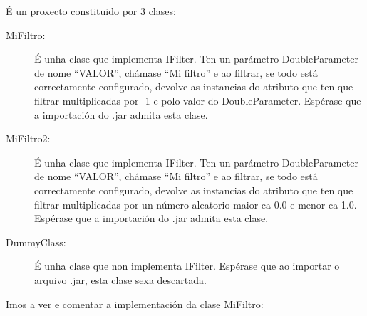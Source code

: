 É un proxecto constituido por 3 clases:

\begin{description}
\item[MiFiltro:] \hfill
É unha clase que implementa IFilter. Ten un parámetro DoubleParameter de nome ``VALOR'', chámase ``Mi filtro'' e ao filtrar, se todo está correctamente configurado, devolve as instancias do atributo que ten que filtrar multiplicadas por -1 e polo valor do DoubleParameter. Espérase que a importación do .jar admita esta clase.
\item[MiFiltro2:] \hfill
É unha clase que implementa IFilter. Ten un parámetro DoubleParameter de nome ``VALOR'', chámase ``Mi filtro'' e ao filtrar, se todo está correctamente configurado, devolve as instancias do atributo que ten que filtrar multiplicadas por un número aleatorio maior ca 0.0 e menor ca 1.0. Espérase que a importación do .jar admita esta clase.
\item[DummyClass:] \hfill
É unha clase que non implementa IFilter. Espérase que ao importar o arquivo .jar, esta clase sexa descartada.
\end{description}

Imos a ver e comentar a implementación da clase MiFiltro:

